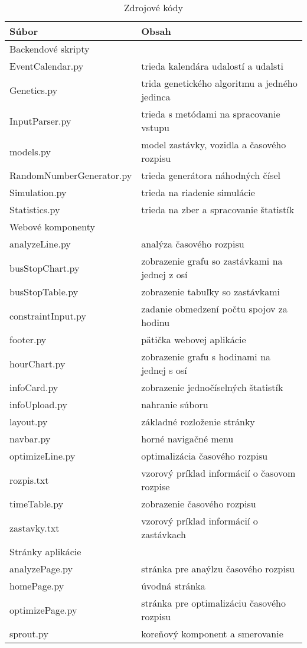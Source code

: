 \begin{table}[h]\label{tab:source_codes}
  \centering
  \begin{tabular}{|l|l|}
    \hline
      \textbf{Súbor} & \textbf{Obsah} \\ \hline
      Backendové skripty & \\
      EventCalendar.py & trieda kalendára udalostí a udalsti \\
      Genetics.py & trida genetického algoritmu a jedného jedinca \\
      InputParser.py & trieda s metódami na spracovanie vstupu \\
      models.py &  model zastávky, vozidla a časového rozpisu\\
      RandomNumberGenerator.py & trieda generátora náhodných čísel \\
      Simulation.py & trieda na riadenie simulácie \\
      Statistics.py & trieda na zber a spracovanie štatistík \\ \hline
      Webové komponenty & \\
      analyzeLine.py & analýza časového rozpisu \\
      busStopChart.py & zobrazenie grafu so zastávkami na jednej z osí \\
      busStopTable.py &zobrazenie tabuľky so zastávkami \\
      constraintInput.py & zadanie obmedzení počtu spojov za hodinu \\
      footer.py & pätička webovej aplikácie \\
      hourChart.py & zobrazenie grafu s hodinami na jednej s osí \\
      infoCard.py & zobrazenie jednočíselných štatistík \\
      infoUpload.py & nahranie súboru \\
      layout.py & základné rozloženie stránky \\
      navbar.py & horné navigačné menu \\
      optimizeLine.py & optimalizácia časového rozpisu \\
      rozpis.txt & vzorový príklad informácií o časovom rozpise \\
      timeTable.py & zobrazenie časového rozpisu \\
      zastavky.txt & vzorový príklad informácií o zastávkach \\ \hline
      Stránky aplikácie & \\
      analyzePage.py & stránka pre anaýlzu časového rozpisu \\
      homePage.py & úvodná stránka \\
      optimizePage.py & stránka pre optimalizáciu časového rozpisu \\ \hline
      sprout.py & koreňový komponent a smerovanie \\ \hline
  \end{tabular}
  \caption{Zdrojové kódy}
\end{table}

